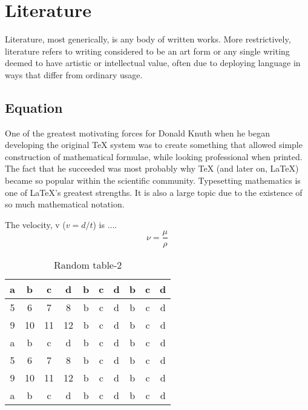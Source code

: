 \chapter{Literature}\label{ch:ch2}
Literature, most generically, is any body of written works. More restrictively, literature refers to writing considered to be an art form or any single writing deemed to have artistic or intellectual value, often due to deploying language in ways that differ from ordinary usage.

\section{Equation}
One of the greatest motivating forces for Donald Knuth when he began developing the original TeX system was to create something that allowed simple construction of mathematical formulae, while looking professional when printed. The fact that he succeeded was most probably why TeX (and later on, LaTeX) became so popular within the scientific community. Typesetting mathematics is one of LaTeX's greatest strengths. It is also a large topic due to the existence of so much mathematical notation. 

The velocity, v ($v=d/t$) is ....
\begin{equation}
\nu = \frac{\mu}{\rho}
\end{equation}

\begin{table}
\centering
\caption{Random table-2}
\label{tab:sample2}
\begin{tabular}{|c|c|c|c|c|c|c|c|c|c|}
\hline 
a & b & c & d & b & c & d & b & c & d \\ \hline 
5 & 6 & 7 & 8 & b & c & d & b & c & d\\ \hline 
9 & 10 & 11 & 12 & b & c & d & b & c & d \\ \hline 
a & b & c & d & b & c & d & b & c & d\\ \hline 
5 & 6 & 7 & 8 & b & c & d & b & c & d\\ \hline 
9 & 10 & 11 & 12 & b & c & d & b & c & d \\ \hline 
a & b & c & d & b & c & d & b & c & d\\ \hline 
\end{tabular} 
\end{table}
